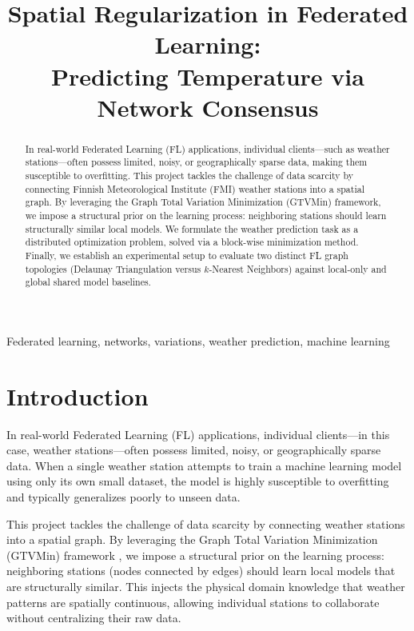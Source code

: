 \documentclass{article}
\title{Spatial Regularization in Federated Learning: \\ Predicting Temperature via Network Consensus}
\begin{document}
\maketitle

\begin{abstract}
In real-world Federated Learning (FL) applications, individual clients---such as weather stations---often possess limited, noisy, or geographically sparse data, making them susceptible to overfitting. This project tackles the challenge of data scarcity by connecting Finnish Meteorological Institute (FMI) weather stations into a spatial graph. By leveraging the Graph Total Variation Minimization (GTVMin) framework, we impose a structural prior on the learning process: neighboring stations should learn structurally similar local models. We formulate the weather prediction task as a distributed optimization problem, solved via a block-wise minimization method. Finally, we establish an experimental setup to evaluate two distinct FL graph topologies (Delaunay Triangulation versus $k$-Nearest Neighbors) against local-only and global shared model baselines.
\end{abstract}

\begin{keywords}
Federated learning, networks, variations, weather prediction, machine learning
\end{keywords}


\section{Introduction}
\label{sec:intro}

In real-world Federated Learning (FL) \cite{AaltoDictML} applications, individual clients---in this case, weather stations---often possess limited, noisy, or geographically sparse data. When a single weather station attempts to train a machine learning model using only its own small dataset, the model is highly susceptible to overfitting and typically generalizes poorly to unseen data.

This project tackles the challenge of data scarcity by connecting weather stations into a spatial graph. By leveraging the Graph Total Variation Minimization (GTVMin) framework \cite{Jung2025}, we impose a structural prior on the learning process: neighboring stations (nodes connected by edges) should learn local models that are structurally similar. This injects the physical domain knowledge that weather patterns are spatially continuous, allowing individual stations to collaborate without centralizing their raw data. 
\end{document}
